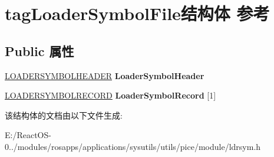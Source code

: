 \hypertarget{structtag_loader_symbol_file}{}\section{tag\+Loader\+Symbol\+File结构体 参考}
\label{structtag_loader_symbol_file}
\subsection*{Public 属性}
\begin{DoxyCompactItemize}
\item 
\mbox{\label{structtag_loader_symbol_file_a5f376eda11e089257338c35bb0703c24}} 
\hyperlink{structtag_loader_symbol_header}{L\+O\+A\+D\+E\+R\+S\+Y\+M\+B\+O\+L\+H\+E\+A\+D\+ER} {\bfseries Loader\+Symbol\+Header}
\item 
\mbox{\label{structtag_loader_symbol_file_a766793829c16001a0224c8659fc0a17a}} 
\hyperlink{structtag_loader_symbol_record}{L\+O\+A\+D\+E\+R\+S\+Y\+M\+B\+O\+L\+R\+E\+C\+O\+RD} {\bfseries Loader\+Symbol\+Record} \mbox{[}1\mbox{]}
\end{DoxyCompactItemize}


该结构体的文档由以下文件生成\+:\begin{DoxyCompactItemize}
\item 
E\+:/\+React\+O\+S-\/0../modules/rosapps/applications/sysutils/utils/pice/module/ldrsym.\+h\end{DoxyCompactItemize}
